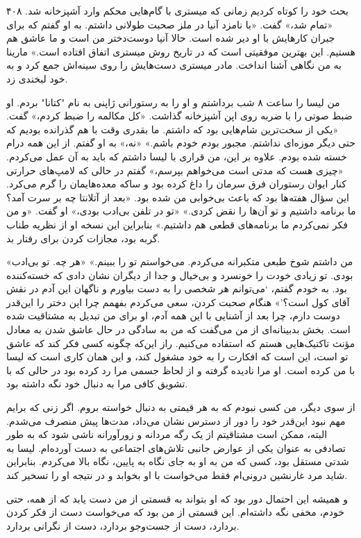 ۴۰۸  
بحث خود را کوتاه کردیم زمانی که میستری با گام‌هایی محکم وارد آشپزخانه شد.  
«تمام شد،» گفت. «با نامزد آنیا در ملز صحبت طولانی داشتم. به او گفتم که برای جبران کارهایش با او دیر شده است. حالا آنیا دوست‌دختر من است و ما عاشق هم هستیم. این بهترین موفقیتی است که در تاریخ روش میستری اتفاق افتاده است.»  
مارینا به من نگاهی آشنا انداخت. مادر میستری دست‌هایش را روی سینه‌اش جمع کرد و به خود لبخندی زد.  

من لیسا را ساعت ۸ شب برداشتم و او را به رستورانی ژاپنی به نام "کتانا" بردم. او ضبط صوتی را با ضربه روی اپن آشپزخانه گذاشت. «کل مکالمه را ضبط کردم،» گفت. «یکی از سخت‌ترین شام‌هایی بود که داشتم. ما بقدری وقت با هم گذرانده بودیم که حتی دیگر موزه‌ای نداشتم. مجبور بودم خودم باشم.»  
«نه،» به او گفتم. از این همه درام خسته شده بودم.  
علاوه بر این، من قراری با لیسا داشتم که باید به آن عمل می‌کردم. «چیزی هست که مدتی است می‌خواهم بپرسم،» گفتم در حالی که لامپ‌های حرارتی کنار ایوان رستوران فرق سرمان را داغ کرده بود و ساکه معده‌هایمان را گرم می‌کرد. این سؤال هفته‌ها بود که باعث بی‌خوابی من شده بود. «بعد از آتلانتا چه بر سرت آمد؟ ما برنامه داشتیم و تو آن‌ها را نقض کردی.»  
«تو در تلفن بی‌ادب بودی،» او گفت. «و من فکر نمی‌کردم ما برنامه‌های قطعی هم داشتیم.» بنابراین این نسخه او از نظریه طناب گربه بود، مجازات کردن برای رفتار بد.  

«من داشتم شوخ طبعی متکبرانه می‌کردم. می‌خواستم تو را ببینم.»  
«هر چه. تو بی‌ادب بودی. تو زیادی خودت را خونسرد و بی‌خیال و جدا از دیگران نشان دادی که خسته‌کننده بود. به خودم گفتم، ‘می‌توانم هر شخصی را به دست بیاورم و ناگهان این آدم در نقش آقای کول است؟’»  
هنگام صحبت کردن، سعی می‌کردم بفهمم چرا این دختر را این‌قدر دوست دارم، چرا بعد از آشنایی با این همه آدم، او برای من تبدیل به مشتاقیت شده است. بخش بدبینانه‌ای از من می‌گفت که من به سادگی در حال عاشق شدن به معادل مؤنث تاکتیک‌هایی هستم که استفاده می‌کنیم. راز این‌که چگونه کسی فکر کند که عاشق تو است، این است که افکارت را به خود مشغول کند، و این همان کاری است که لیسا با من کرده است. او مرا نادیده گرفته و از لحاظ جسمی مرا رد کرده بود در حالی که با تشویق کافی مرا به دنبال خود نگه داشته بود.  

از سوی دیگر، من کسی نبودم که به هر قیمتی به دنبال خواسته بروم. اگر زنی که برایم مهم نبود این‌قدر خود را دور از دسترس نشان می‌داد، مدت‌ها پیش منصرف می‌شدم. البته، ممکن است مشتاقیتم از یک رگه مردانه و زورآورانه ناشی شود که به طور تصادفی به عنوان یکی از عوارض جانبی تلاش‌های اجتماعی به دست آورده‌ام. لیسا به شدتی مستقل بود، کسی که من به او به جای نگاه به پایین، نگاه بالا می‌کردم. بنابراین شاید مرد غارنشین درونی‌ام فقط می‌خواست با او بخوابد و در نتیجه او را تسخیر کند.  

و همیشه این احتمال دور بود که او بتواند به قسمتی از من دست یابد که از همه، حتی خودم، مخفی نگه داشته‌ام. این قسمتی از من بود که می‌خواست دست از فکر کردن بردارد، دست از جست‌وجو بردارد، دست از نگرانی بردارد.